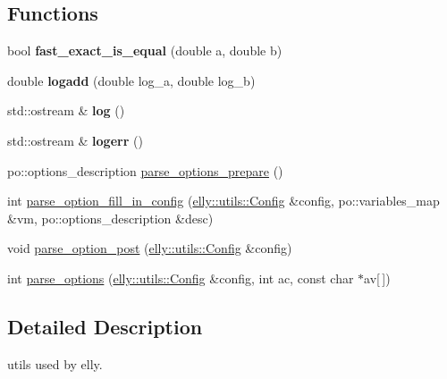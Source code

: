 \subsection*{Functions}
\begin{DoxyCompactItemize}
\item 
\hypertarget{namespacemia_1_1elly_1_1utils_a7ee3c4db368fdd650eefde6d084bfbbb}{bool {\bfseries fast\-\_\-exact\-\_\-is\-\_\-equal} (double a, double b)}\label{namespacemia_1_1elly_1_1utils_a7ee3c4db368fdd650eefde6d084bfbbb}

\item 
\hypertarget{namespacemia_1_1elly_1_1utils_a5d82b4bd55ead7b3c8a7bf0ece890734}{double {\bfseries logadd} (double log\-\_\-a, double log\-\_\-b)}\label{namespacemia_1_1elly_1_1utils_a5d82b4bd55ead7b3c8a7bf0ece890734}

\item 
\hypertarget{namespacemia_1_1elly_1_1utils_a374ba5eaba5d4098168c76c5ae7b4190}{std\-::ostream \& {\bfseries log} ()}\label{namespacemia_1_1elly_1_1utils_a374ba5eaba5d4098168c76c5ae7b4190}

\item 
\hypertarget{namespacemia_1_1elly_1_1utils_a23141eae8cac2f0c0899f767a24c8c93}{std\-::ostream \& {\bfseries logerr} ()}\label{namespacemia_1_1elly_1_1utils_a23141eae8cac2f0c0899f767a24c8c93}

\item 
po\-::options\-\_\-description \hyperlink{namespacemia_1_1elly_1_1utils_aeeeb102180327b7894318204b9e09204}{parse\-\_\-options\-\_\-prepare} ()
\item 
int \hyperlink{namespacemia_1_1elly_1_1utils_a36bd3ac5a27733eb19d84be42bb069ed}{parse\-\_\-option\-\_\-fill\-\_\-in\-\_\-config} (\hyperlink{classmia_1_1elly_1_1utils_1_1_config}{elly\-::utils\-::\-Config} \&config, po\-::variables\-\_\-map \&vm, po\-::options\-\_\-description \&desc)
\item 
void \hyperlink{namespacemia_1_1elly_1_1utils_a0e4ef9404cd6d6ffcd1804c5fbbd2eb0}{parse\-\_\-option\-\_\-post} (\hyperlink{classmia_1_1elly_1_1utils_1_1_config}{elly\-::utils\-::\-Config} \&config)
\item 
int \hyperlink{namespacemia_1_1elly_1_1utils_a920b8e899ab5533ddfe8feac3eacf439}{parse\-\_\-options} (\hyperlink{classmia_1_1elly_1_1utils_1_1_config}{elly\-::utils\-::\-Config} \&config, int ac, const char $\ast$av\mbox{[}$\,$\mbox{]})
\end{DoxyCompactItemize}


\subsection{Detailed Description}
utils used by elly. 


